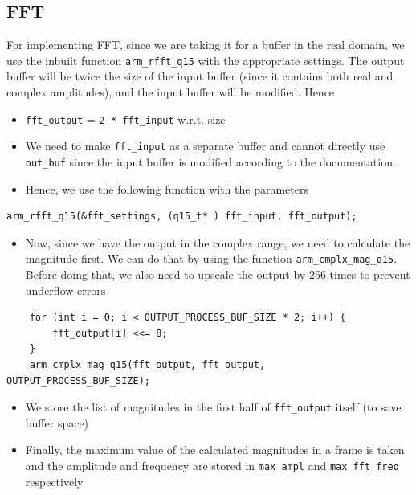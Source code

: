 \documentclass[11pt]{article}
\begin{document}
\subsection{FFT}
\label{sec:org200cc92}

For implementing FFT, since we are taking it for a buffer in the real domain, we use the inbuilt function \texttt{arm\_rfft\_q15} with the appropriate settings. The output buffer will be twice the size of the input buffer (since it contains both real and complex amplitudes), and the input buffer will be modified. Hence
\begin{itemize}
\item \texttt{fft\_output} = \texttt{2 * fft\_input} w.r.t. size
\item We need to make \texttt{fft\_input} as a separate buffer and cannot directly use \texttt{out\_buf} since the input buffer is modified according to the documentation.

\item Hence, we use the following function with the parameters
\end{itemize}
\begin{verbatim}
arm_rfft_q15(&fft_settings, (q15_t* ) fft_input, fft_output);
\end{verbatim}

\begin{itemize}
\item Now, since we have the output in the complex range, we need to calculate the magnitude first. We can do that by using the function \texttt{arm\_cmplx\_mag\_q15}. Before doing that, we also need to upscale the output by 256 times to prevent underflow errors
\end{itemize}

\begin{verbatim}
	for (int i = 0; i < OUTPUT_PROCESS_BUF_SIZE * 2; i++) {
		fft_output[i] <<= 8;
	}
    arm_cmplx_mag_q15(fft_output, fft_output, OUTPUT_PROCESS_BUF_SIZE);
\end{verbatim}

\begin{itemize}
\item We store the list of magnitudes in the first half of \texttt{fft\_output} itself (to save buffer space)

\item Finally, the maximum value of the calculated magnitudes in a frame is taken and the amplitude and frequency are stored in \texttt{max\_ampl} and \texttt{max\_fft\_freq} respectively
\end{itemize}
\end{document}
